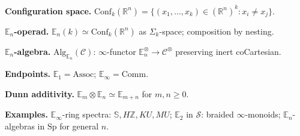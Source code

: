 \begin{formalrestatement}
\textbf{Configuration space.}\quad
$\mathrm{Conf}_k(\mathbb{R}^n) = \{(x_1, \ldots, x_k) \in (\mathbb{R}^n)^k : x_i \neq x_j\}$.

\medskip
\textbf{$\mathbb{E}_n$-operad.}\quad
$\mathbb{E}_n(k) \simeq \mathrm{Conf}_k(\mathbb{R}^n)$ as $\Sigma_k$-space;
composition by nesting.

\medskip
\textbf{$\mathbb{E}_n$-algebra.}\quad
$\mathrm{Alg}_{\mathbb{E}_n}(\mathcal{C})$: $\infty$-functor
$\mathbb{E}_n^\otimes \to \mathcal{C}^\otimes$ preserving inert coCartesian.

\medskip
\textbf{Endpoints.}\quad
$\mathbb{E}_1 = \mathrm{Assoc}$; $\mathbb{E}_\infty = \mathrm{Comm}$.

\medskip
\textbf{Dunn additivity.}\quad
$\mathbb{E}_m \otimes \mathbb{E}_n \simeq \mathbb{E}_{m+n}$ for $m, n \geq 0$.

\medskip
\textbf{Examples.}\quad
$\mathbb{E}_\infty$-ring spectra: $\mathbb{S}, H\mathbb{Z}, KU, MU$;
$\mathbb{E}_2$ in $\mathcal{S}$: braided $\infty$-monoids;
$\mathbb{E}_n$-algebras in $\mathrm{Sp}$ for general $n$.
\end{formalrestatement}
